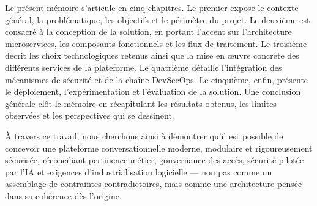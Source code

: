Le présent mémoire s'articule en cinq chapitres. Le premier expose le contexte général, la problématique, les objectifs et le périmètre du projet. Le deuxième est consacré à la conception de la solution, en portant l'accent sur l'architecture microservices, les composants fonctionnels et les flux de traitement. Le troisième décrit les choix technologiques retenus ainsi que la mise en œuvre concrète des différents services de la plateforme. Le quatrième détaille l'intégration des mécanismes de sécurité et de la chaîne DevSecOps. Le cinquième, enfin, présente le déploiement, l'expérimentation et l'évaluation de la solution. Une conclusion générale clôt le mémoire en récapitulant les résultats obtenus, les limites observées et les perspectives qui se dessinent.

À travers ce travail, nous cherchons ainsi à démontrer qu'il est possible de concevoir une plateforme conversationnelle moderne, modulaire et rigoureusement sécurisée, réconciliant pertinence métier, gouvernance des accès, sécurité pilotée par l'IA et exigences d'industrialisation logicielle — non pas comme un assemblage de contraintes contradictoires, mais comme une architecture pensée dans sa cohérence dès l'origine.

